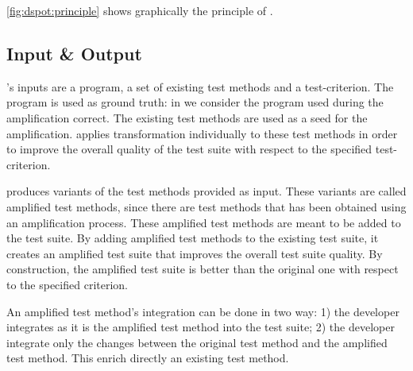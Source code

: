 \autoref{fig:dspot:principle} shows graphically the principle of \dspot.

\subsection{Input \& Output}
\label{subsec:dspot:overview:input-and-output}

\dspot's inputs are a program, a set of existing test methods and a test-criterion.
The program is used as ground truth: in \dspot we consider the program used during the amplification correct.
The existing test methods are used as a seed for the amplification.
\dspot applies transformation individually to these test methods in order to improve the overall quality of the test suite with respect to the specified test-criterion.

\dspot produces variants of the test methods provided as input.
These variants are called amplified test methods, since there are test methods that has been obtained using an amplification process.
These amplified test methods are meant to be added to the test suite.
By adding amplified test methods to the existing test suite, it creates an amplified test suite that improves the overall test suite quality.
By construction, the amplified test suite is better than the original one with respect to the specified criterion.

An amplified test method's integration can be done in two way:
1) the developer integrates as it is the amplified test method into the test suite;
2) the developer integrate only the changes between the original test method and the amplified test method.
This enrich directly an existing test method.

